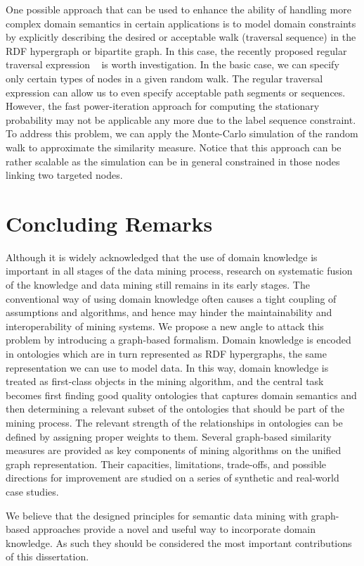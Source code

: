 One possible approach that can be used to enhance the ability of handling more complex domain semantics in certain applications is to model domain constraints by explicitly describing the desired or acceptable walk (traversal sequence) in the RDF hypergraph or bipartite graph. In this case, the recently proposed regular traversal expression ~\cite{Marko10} is worth investigation. In the basic case, we can specify only certain types of nodes in a given random walk. The regular traversal expression can allow us to even specify acceptable path segments or sequences. However, the fast power-iteration approach for computing the stationary probability may not be applicable any more due to the label sequence constraint. To address this problem, we can apply the Monte-Carlo simulation of the random walk to approximate the similarity measure. Notice that this approach can be rather scalable as the simulation can be in general constrained in those nodes linking two targeted nodes.

\section{Concluding Remarks}
Although it is widely acknowledged that the use of domain knowledge is important in all stages of the data mining process, research on systematic fusion of the knowledge and data mining still remains in its early stages. The conventional way of using domain knowledge often causes a tight coupling of assumptions and algorithms, and hence may hinder the maintainability and interoperability of mining systems. We propose a new angle to attack this problem by introducing a graph-based formalism. Domain knowledge is encoded in ontologies which are in turn represented as RDF hypergraphs, the same representation we can use to model data. In this way, domain knowledge is treated as first-class objects in the mining algorithm, and the central task becomes first finding good quality ontologies that captures domain semantics and then determining a relevant subset of the ontologies that should be part of the mining process. The relevant strength of the relationships in ontologies can be defined by assigning proper weights to them. Several graph-based similarity measures are provided as key components of mining algorithms on the unified graph representation. Their capacities, limitations, trade-offs, and possible directions for improvement are studied on a series of synthetic and real-world case studies.

We believe that the designed principles for semantic data mining with graph-based approaches provide a novel and useful way to incorporate domain knowledge. As such they should be considered the most important contributions of this dissertation. 